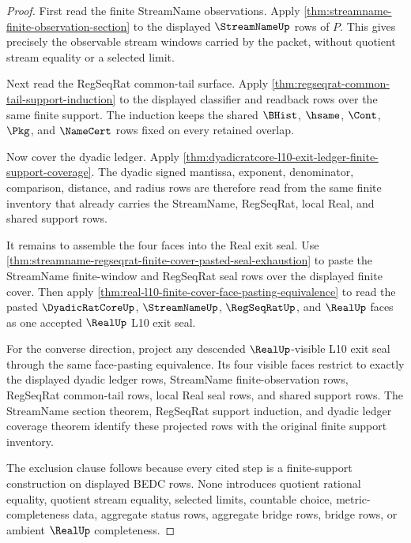 \begin{proof}
First read the finite StreamName observations. Apply \autoref{thm:streamname-finite-observation-section} to the displayed $\StreamNameUp$ rows of $P$. This gives precisely the observable stream windows carried by the packet, without quotient stream equality or a selected limit.

Next read the RegSeqRat common-tail surface. Apply \autoref{thm:regseqrat-common-tail-support-induction} to the displayed classifier and readback rows over the same finite support. The induction keeps the shared $\BHist$, $\hsame$, $\Cont$, $\Pkg$, and $\NameCert$ rows fixed on every retained overlap.

Now cover the dyadic ledger. Apply \autoref{thm:dyadicratcore-l10-exit-ledger-finite-support-coverage}. The dyadic signed mantissa, exponent, denominator, comparison, distance, and radius rows are therefore read from the same finite inventory that already carries the StreamName, RegSeqRat, local Real, and shared support rows.

It remains to assemble the four faces into the Real exit seal. Use \autoref{thm:streamname-regseqrat-finite-cover-pasted-seal-exhaustion} to paste the StreamName finite-window and RegSeqRat seal rows over the displayed finite cover. Then apply \autoref{thm:real-l10-finite-cover-face-pasting-equivalence} to read the pasted $\DyadicRatCoreUp$, $\StreamNameUp$, $\RegSeqRatUp$, and $\RealUp$ faces as one accepted $\RealUp$ L10 exit seal.

For the converse direction, project any descended $\RealUp$-visible L10 exit seal through the same face-pasting equivalence. Its four visible faces restrict to exactly the displayed dyadic ledger rows, StreamName finite-observation rows, RegSeqRat common-tail rows, local Real seal rows, and shared support rows. The StreamName section theorem, RegSeqRat support induction, and dyadic ledger coverage theorem identify these projected rows with the original finite support inventory.

The exclusion clause follows because every cited step is a finite-support construction on displayed BEDC rows. None introduces quotient rational equality, quotient stream equality, selected limits, countable choice, metric-completeness data, aggregate status rows, aggregate bridge rows, bridge rows, or ambient $\RealUp$ completeness.
\end{proof}
